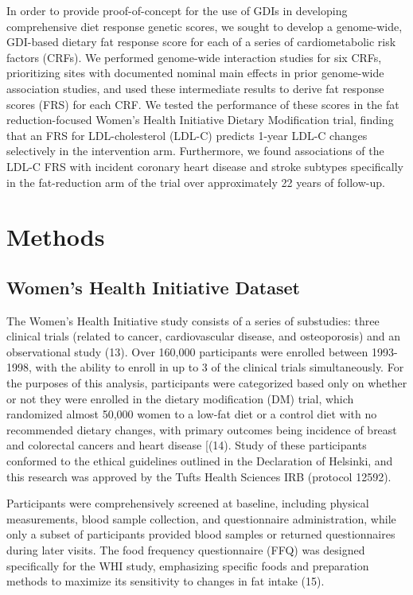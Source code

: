 \documentclass[]{article}
\begin{document}
In order to provide proof-of-concept for the use of GDIs in developing
comprehensive diet response genetic scores, we sought to develop a
genome-wide, GDI-based dietary fat response score for each of a series
of cardiometabolic risk factors (CRFs). We performed genome-wide
interaction studies for six CRFs, prioritizing sites with documented
nominal main effects in prior genome-wide association studies, and used
these intermediate results to derive fat response scores (FRS) for each
CRF. We tested the performance of these scores in the fat
reduction-focused Women's Health Initiative Dietary Modification trial,
finding that an FRS for LDL-cholesterol (LDL-C) predicts 1-year LDL-C
changes selectively in the intervention arm. Furthermore, we found
associations of the LDL-C FRS with incident coronary heart disease and
stroke subtypes specifically in the fat-reduction arm of the trial over
approximately 22 years of follow-up.

\hypertarget{methods}{%
\section{Methods}\label{methods}}

\hypertarget{womens-health-initiative-dataset}{%
\subsection{Women's Health Initiative
Dataset}\label{womens-health-initiative-dataset}}

The Women's Health Initiative study consists of a series of substudies:
three clinical trials (related to cancer, cardiovascular disease, and
osteoporosis) and an observational study (13). Over 160,000 participants
were enrolled between 1993-1998, with the ability to enroll in up to 3
of the clinical trials simultaneously. For the purposes of this
analysis, participants were categorized based only on whether or not
they were enrolled in the dietary modification (DM) trial, which
randomized almost 50,000 women to a low-fat diet or a control diet with
no recommended dietary changes, with primary outcomes being incidence of
breast and colorectal cancers and heart disease {[}(14). Study of these
participants conformed to the ethical guidelines outlined in the
Declaration of Helsinki, and this research was approved by the Tufts
Health Sciences IRB (protocol 12592).

Participants were comprehensively screened at baseline, including
physical measurements, blood sample collection, and questionnaire
administration, while only a subset of participants provided blood
samples or returned questionnaires during later visits. The food
frequency questionnaire (FFQ) was designed specifically for the WHI
study, emphasizing specific foods and preparation methods to maximize
its sensitivity to changes in fat intake (15).
\end{document}
